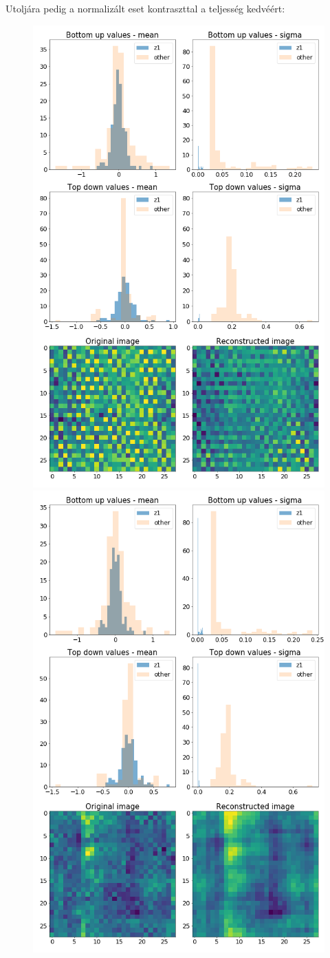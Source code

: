 \documentclass[12pt, english]{article}
\begin{document}
\par Utoljára pedig a normalizált eset kontraszttal a teljesség kedvéért:

\vspace{4mm}

\begin{figure}[H]
  \begin{minipage}{0.5\linewidth}
    \centering
    \includegraphics[width=.6\linewidth]{z1_vis/z1_vis_norm_contrast/16_DenseLinLinLadderVAE_textures_contrastNorm_contrast-stats-1_TD_BU_COMPS_1.png}
  \end{minipage}
  \begin{minipage}{0.5\linewidth}
    \centering
    \includegraphics[width=.6\linewidth]{z1_vis/z1_vis_norm_contrast/16_DenseLinLinLadderVAE_textures_contrastNorm_contrast-stats-2_TD_BU_COMPS_1.png}
  \end{minipage}


\end{figure}
\end{document}
